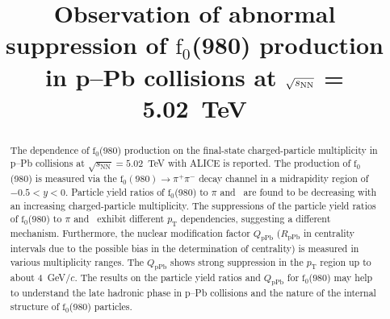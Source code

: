 \documentclass[ALICE,manyauthors]{cernphprep}
\begin{document}
\begin{titlepage}

\PHyear{}
\PHdate{\today}
%

\title{Observation of abnormal suppression of $\mathrm{f}_{0}$(980) production \\in p--Pb collisions at $\sqrt{s_{\rm NN}}$ = 5.02~TeV }

\ShortTitle{}   %


\begin{abstract}
The dependence of $\mathrm{f}_{0}$(980) production on the final-state charged-particle multiplicity in p--Pb collisions at $\sqrt{s_{\mathrm{NN}}} = 5.02$~TeV with ALICE is reported. The production of $\mathrm{f}_{0}$(980) is measured via the $\mathrm{f}_0 (980) \rightarrow \pi^{+}\pi^{-}$ decay channel in a midrapidity region of $-0.5<y<0$. Particle yield ratios of $\mathrm{f}_{0}$(980) to $\pi$ and \kstar~are found to be decreasing with an increasing charged-particle multiplicity. The suppressions of the particle yield ratios of $\mathrm{f}_{0}$(980) to $\pi$ and \kstar~exhibit different $p_{\mathrm{T}}$ dependencies, suggesting a different mechanism. Furthermore, the nuclear modification factor $Q_{\mbox{pPb}}$ ($R_{\mbox{pPb}}$ in centrality intervals due to the possible bias in the determination of centrality) is measured in various multiplicity ranges. The $Q_{\mbox{pPb}}$ shows strong suppression in the  $p_{\mathrm{T}}$ region up to about 4~GeV/$c$. The results on the particle yield ratios and $Q_{\mbox{pPb}}$ for $\mathrm{f}_{0}$(980) may help to understand the late hadronic phase in p--Pb collisions and the nature of the internal structure of $\mathrm{f}_{0}$(980) particles.



\color{black}

\end{abstract}
 
\end{titlepage}

\setcounter{page}{2}
\end{document}
